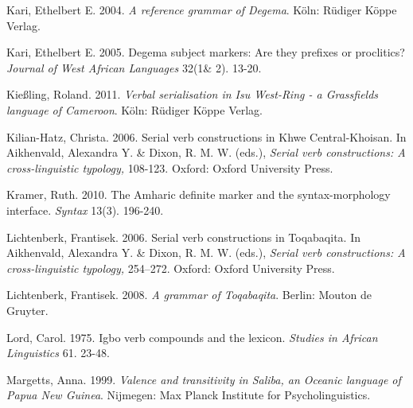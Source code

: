 \begin{styleNoSpacing}
Kari, Ethelbert E. 2004. \textit{A reference grammar of Degema}. Köln: Rüdiger Köppe Verlag.
\end{styleNoSpacing}

\begin{styleNoSpacing}
Kari, Ethelbert E. 2005. Degema subject markers: Are they prefixes or proclitics? \textit{Journal of West African Languages} 32(1\& 2). 13-20.
\end{styleNoSpacing}

\begin{styleNoSpacing}
Kießling, Roland. 2011. \textit{Verbal serialisation in Isu West-Ring - a Grassfields language of Cameroon}. Köln: Rüdiger Köppe Verlag.
\end{styleNoSpacing}

\begin{styleNoSpacing}
Kilian-Hatz, Christa. 2006. Serial verb constructions in Khwe Central-Khoisan. In Aikhenvald, Alexandra Y. \& Dixon, R. M. W. (eds.), \textit{Serial verb constructions: A cross-linguistic typology, }108-123. Oxford: Oxford University Press.
\end{styleNoSpacing}

\begin{styleNoSpacing}
Kramer, Ruth. 2010. The Amharic definite marker and the syntax-morphology interface. \textit{Syntax} 13(3). 196-240.
\end{styleNoSpacing}

\begin{styleNoSpacing}
Lichtenberk, Frantisek. 2006. Serial verb constructions in Toqabaqita. In Aikhenvald, Alexandra Y. \& Dixon, R. M. W. (eds.), \textit{Serial verb constructions: A cross-linguistic typology,} 254–272. Oxford: Oxford University Press.
\end{styleNoSpacing}

\begin{styleNoSpacing}
Lichtenberk, Frantisek. 2008. \textit{A grammar of Toqabaqita}. Berlin: Mouton de Gruyter. 
\end{styleNoSpacing}

\begin{styleNoSpacing}
Lord, Carol. 1975. Igbo verb compounds and the lexicon. \textit{Studies in African Linguistics} 61. 23-48.
\end{styleNoSpacing}

\begin{styleNoSpacing}
Margetts, Anna. 1999. \textit{Valence and transitivity in Saliba, an Oceanic language of Papua New Guinea}. Nijmegen: Max Planck Institute for Psycholinguistics.
\end{styleNoSpacing}

